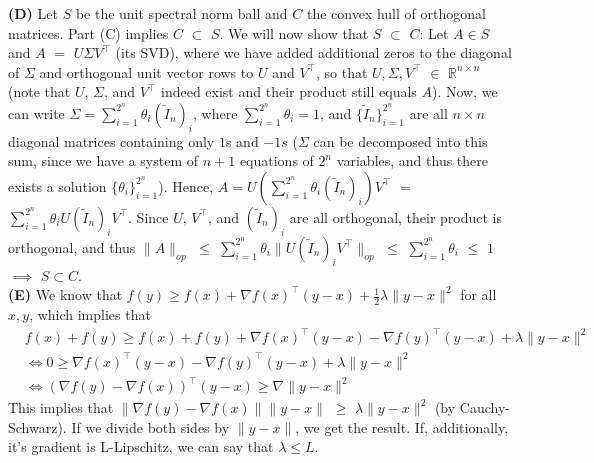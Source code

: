 \documentclass{article}
\begin{document}
\textbf{(D)} Let $S$ be the unit spectral norm ball and $C$ the convex hull of
orthogonal matrices. Part (C) implies $C$ $\subset$ $S$. We will now show that
$S$ $\subset$ $C$: Let $A \in S$ and $A$ $=$ $U \Sigma V^{\top}$ (its SVD),
where we have added additional zeros to the diagonal of $\Sigma$ and orthogonal
unit vector rows to $U$ and $V^{\top}$, so that $U,\Sigma,V^{\top}$ $\in$
$\mathbb{R}^{n \times n}$ (note that $U$, $\Sigma$, and $V^{\top}$ indeed exist
and their product still equals $A$). Now, we can write $\Sigma =
\sum_{i=1}^{2^n} \theta_i (\tilde{I}_n)_i$, where $\sum_{i=1}^{2^n} \theta_i =
1$, and $\{\tilde{I}_n\}_{i=1}^{2^n}$ are all $n \times n$ diagonal matrices
containing only $1$s and $-1s$ ($\Sigma$ can be decomposed into this sum, since
we have a system of $n+1$ equations of $2^n$ variables, and thus there exists a
solution $\{\theta_i\}_{i=1}^{2^n}$). Hence, $A = U (\sum_{i=1}^{2^n} \theta_i
(\tilde{I}_n)_i)V^{\top}$ $=$ $\sum_{i=1}^{2^n} \theta_i U(\tilde{I}_n)_i
V^{\top}$. Since $U$, $V^{\top}$, and $(\tilde{I}_n)_i$ are all orthogonal,
their product is orthogonal, and thus $\|A\|_{op}$ $\leq$ $\sum_{i=1}^{2^n}
\theta_i \|U (\tilde{I}_n)_i V^{\top}\|_{op}$ $\leq$ $\sum_{i=1}^{2^n}
\theta_i$ $\leq$ $1$ $\implies$ $S \subset C$.\\


\textbf{(E)}
We know that $f(y) \geq f(x) + \nabla f(x)^\top(y-x) + \frac{1}{2}\lambda
\|y-x\|^2$ for all $x,y$, which implies that
\begin{align}
    &f(x) + f(y) \geq f(x) + f(y) + \nabla f(x)^\top(y-x) - \nabla f(y)^\top
        (y-x) + \lambda \|y-x\|^2\\
    &\iff 0 \geq \nabla f(x)^\top (y-x) - \nabla f(y)^\top(y-x) + \lambda
        \|y-x\|^2 \\
    &\iff (\nabla f(y) - \nabla f(x))^\top (y-x) \geq \nabla \|y-x\|^2
\end{align}
This implies that $\|\nabla f(y) - \nabla f(x)\| \|y-x\|$ $\geq$ $\lambda
\|y-x\|^2$ (by Cauchy-Schwarz). If we divide both sides by $\|y - x\|$, we get
the result. If, additionally, it's gradient is L-Lipschitz, we can say that
$\lambda \leq L$.
\end{document}
